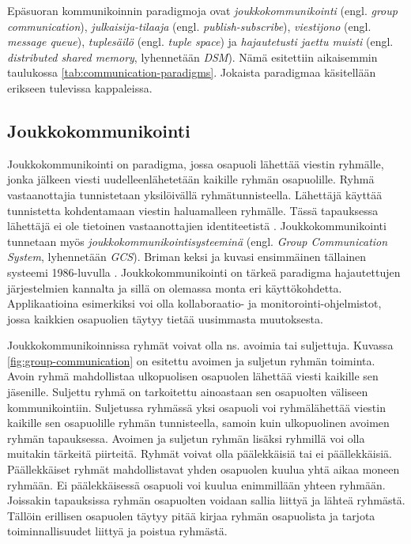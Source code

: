 Epäsuoran kommunikoinnin paradigmoja ovat \emph{joukkokommunikointi} (engl. \emph{group communication}), \emph{julkaisija-tilaaja} (engl. \emph{publish-subscribe}), \emph{viestijono} (engl. \emph{message queue}), \emph{tuplesäilö} (engl. \emph{tuple space}) ja \emph{hajautetusti jaettu muisti} (engl. \emph{distributed shared memory}, lyhennetään \emph{DSM}). Nämä esitettiin aikaisemmin taulukossa \ref{tab:communication-paradigms}. Jokaista paradigmaa käsitellään erikseen tulevissa kappaleissa.



\subsection{Joukkokommunikointi}
Joukkokommunikointi on paradigma, jossa osapuoli lähettää viestin ryhmälle, jonka jälkeen viesti uudelleenlähetetään kaikille ryhmän osapuolille. Ryhmä vastaanottajia tunnistetaan yksilöivällä ryhmätunnisteella. Lähettäjä käyttää tunnistetta kohdentamaan viestin haluamalleen ryhmälle. Tässä tapauksessa lähettäjä ei ole tietoinen vastaanottajien identiteetistä \cite[s.~232--233]{distributed-systems-concepts-and-design}. Joukkokommunikointi tunnetaan myös \emph{joukkokommunikointisysteeminä} (engl. \emph{Group Communication System}, lyhennetään \emph{GCS}). Briman keksi ja kuvasi ensimmäinen tällainen systeemi 1986-luvulla \cite{isis-fault-tolerant-distributed-computing}. Joukkokommunikointi on tärkeä paradigma hajautettujen järjestelmien kannalta ja sillä on olemassa monta eri käyttökohdetta. Applikaatioina esimerkiksi voi olla kollaboraatio- ja monitorointi-ohjelmistot, jossa kaikkien osapuolien täytyy tietää uusimmasta muutoksesta.

Joukkokommunikoinnissa ryhmät voivat olla ns. avoimia tai suljettuja. Kuvassa \ref{fig:group-communication} on esitettu avoimen ja suljetun ryhmän toiminta. Avoin ryhmä mahdollistaa ulkopuolisen osapuolen lähettää viesti kaikille sen jäsenille. Suljettu ryhmä on tarkoitettu ainoastaan sen osapuolten väliseen kommunikointiin. Suljetussa ryhmässä yksi osapuoli voi ryhmälähettää viestin kaikille sen osapuolille ryhmän tunnisteella, samoin kuin ulkopuolinen avoimen ryhmän tapauksessa. Avoimen ja suljetun ryhmän lisäksi ryhmillä voi olla muitakin tärkeitä piirteitä. Ryhmät voivat olla päälekkäisiä tai ei päällekkäisiä. Päällekkäiset ryhmät mahdollistavat yhden osapuolen kuulua yhtä aikaa moneen ryhmään. Ei päälekkäisessä osapuoli voi kuulua enimmillään yhteen ryhmään. Joissakin tapauksissa ryhmän osapuolten voidaan sallia liittyä ja lähteä ryhmästä. Tällöin erillisen osapuolen täytyy pitää kirjaa ryhmän osapuolista ja tarjota toiminnallisuudet liittyä ja poistua ryhmästä. \mbox{\cite[s.~233--235]{distributed-systems-concepts-and-design}} \mbox{\cite[s.~48]{process-group-approach-briman}}


